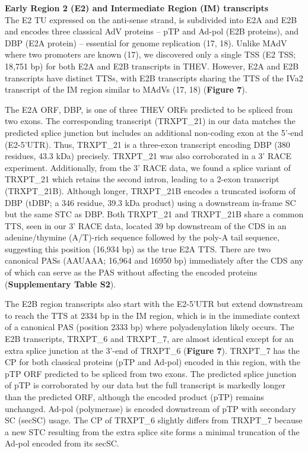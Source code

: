 \documentclass[
]{article}
\begin{document}
\textbf{Early Region 2 (E2) and Intermediate Region (IM) transcripts}\\
The E2 TU expressed on the anti-sense strand, is subdivided into E2A and
E2B and encodes three classical AdV proteins -- pTP and Ad-pol (E2B
proteins), and DBP (E2A protein) -- essential for genome replication
(17, 18). Unlike MAdV where two promoters are known (17), we discovered
only a single TSS (E2 TSS; 18,751 bp) for both E2A and E2B transcripts
in THEV. However, E2A and E2B transcripts have distinct TTSs, with E2B
transcripts sharing the TTS of the IVa2 transcript of the IM region
similar to MAdVs (17, 18) (\textbf{Figure 7}).

The E2A ORF, DBP, is one of three THEV ORFs predicted to be spliced from
two exons. The corresponding transcript (TRXPT\_21) in our data matches
the predicted splice junction but includes an additional non-coding exon
at the 5'-end (E2-5'UTR). Thus, TRXPT\_21 is a three-exon transcript
encoding DBP (380 residues, 43.3 kDa) precisely. TRXPT\_21 was also
corroborated in a 3' RACE experiment. Additionally, from the 3' RACE
data, we found a splice variant of TRXPT\_21 which retains the second
intron, leading to a 2-exon transcript (TRXPT\_21B). Although longer,
TRXPT\_21B encodes a truncated isoform of DBP (tDBP; a 346 residue, 39.3
kDa product) using a downstream in-frame SC but the same STC as DBP.
Both TRXPT\_21 and TRXPT\_21B share a common TTS, seen in our 3' RACE
data, located 39 bp downstream of the CDS in an adenine/thymine
(A/T)-rich sequence followed by the poly-A tail sequence, suggesting
this position (16,934 bp) as the true E2A TTS. There are two canonical
PASs (AAUAAA; 16,964 and 16950 bp) immediately after the CDS any of
which can serve as the PAS without affecting the encoded proteins
(\textbf{Supplementary Table S2}).

The E2B region transcripts also start with the E2-5'UTR but extend
downstream to reach the TTS at 2334 bp in the IM region, which is in the
immediate context of a canonical PAS (position 2333 bp) where
polyadenylation likely occurs. The E2B transcripts, TRXPT\_6 and
TRXPT\_7, are almost identical except for an extra splice junction at
the 3'-end of TRXPT\_6 (\textbf{Figure 7}). TRXPT\_7 has the CP for both
classical proteins (pTP and Ad-pol) encoded in this region, with the pTP
ORF predicted to be spliced from two exons. The predicted splice
junction of pTP is corroborated by our data but the full transcript is
markedly longer than the predicted ORF, although the encoded product
(pTP) remains unchanged. Ad-pol (polymerase) is encoded downstream of
pTP with secondary SC (secSC) usage. The CP of TRXPT\_6 slightly differs
from TRXPT\_7 because a new STC resulting from the extra splice site
forms a minimal truncation of the Ad-pol encoded from its secSC.
\end{document}
